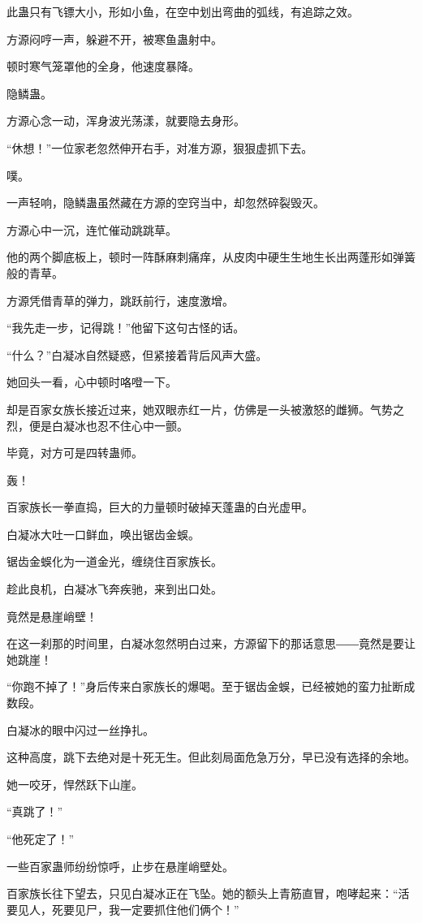 \begin{this_body}
此蛊只有飞镖大小，形如小鱼，在空中划出弯曲的弧线，有追踪之效。

方源闷哼一声，躲避不开，被寒鱼蛊射中。

顿时寒气笼罩他的全身，他速度暴降。

隐鳞蛊。

方源心念一动，浑身波光荡漾，就要隐去身形。

“休想！”一位家老忽然伸开右手，对准方源，狠狠虚抓下去。

噗。

一声轻响，隐鳞蛊虽然藏在方源的空窍当中，却忽然碎裂毁灭。

方源心中一沉，连忙催动跳跳草。

他的两个脚底板上，顿时一阵酥麻刺痛痒，从皮肉中硬生生地生长出两蓬形如弹簧般的青草。

方源凭借青草的弹力，跳跃前行，速度激增。

“我先走一步，记得跳！”他留下这句古怪的话。

“什么？”白凝冰自然疑惑，但紧接着背后风声大盛。

她回头一看，心中顿时咯噔一下。

却是百家女族长接近过来，她双眼赤红一片，仿佛是一头被激怒的雌狮。气势之烈，便是白凝冰也忍不住心中一颤。

毕竟，对方可是四转蛊师。

轰！

百家族长一拳直捣，巨大的力量顿时破掉天蓬蛊的白光虚甲。

白凝冰大吐一口鲜血，唤出锯齿金蜈。

锯齿金蜈化为一道金光，缠绕住百家族长。

趁此良机，白凝冰飞奔疾驰，来到出口处。

竟然是悬崖峭壁！

在这一刹那的时间里，白凝冰忽然明白过来，方源留下的那话意思――竟然是要让她跳崖！

“你跑不掉了！”身后传来白家族长的爆喝。至于锯齿金蜈，已经被她的蛮力扯断成数段。

白凝冰的眼中闪过一丝挣扎。

这种高度，跳下去绝对是十死无生。但此刻局面危急万分，早已没有选择的余地。

她一咬牙，悍然跃下山崖。

“真跳了！”

“他死定了！”

一些百家蛊师纷纷惊呼，止步在悬崖峭壁处。

百家族长往下望去，只见白凝冰正在飞坠。她的额头上青筋直冒，咆哮起来：“活要见人，死要见尸，我一定要抓住他们俩个！”


\end{this_body}
